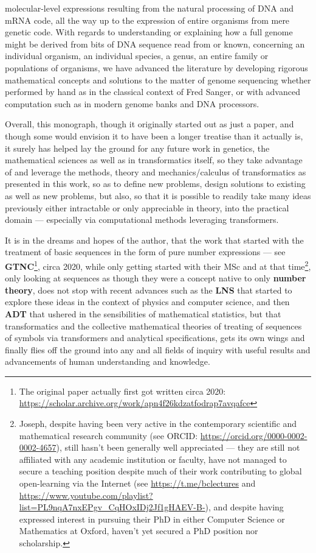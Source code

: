 \documentclass[a4paper, 18pt]{book} %
\begin{document}
molecular-level expressions resulting from the natural processing of DNA and mRNA code, all the way up to the expression of entire organisms from mere genetic code. With regards to understanding or explaining how a full genome might be derived from bits of DNA sequence read from or known, concerning an individual organism, an individual species, a genus, an entire family or populations of organisms, we have advanced the literature by developing rigorous mathematical concepts and solutions to the matter of genome sequencing whether performed by hand as in the classical context of Fred Sanger, or with advanced computation such as in modern genome banks and DNA processors. 

Overall, this monograph, though it originally started out as just a paper, and though some would envision it to have been a longer treatise than it actually is, it surely has helped lay the ground for any future work in genetics, the mathematical sciences as well as in transformatics itself, so they take advantage of and leverage the methods, theory and mechanics/calculus of transformatics as presented in this work, so as to define new problems, design solutions to existing as well as new problems, but also, so that it is possible to readily take many ideas previously either intractable or only appreciable in theory, into the practical domain --- especially via computational methods leveraging transformers.

It is in the dreams and hopes of the author, that the work that started with the treatment of basic sequences in the form of pure number expressions --- see \textbf{GTNC}\footnote{The original paper actually first got written circa 2020: \url{https://scholar.archive.org/work/apn4f26kdzatfodrap7avqafce}}\cite{Lutalo2024gtnc}, circa 2020, while only getting started with their MSc and at that time\footnote{Joseph, despite having been very active in the contemporary scientific and mathematical research community (see ORCID: \url{https://orcid.org/0000-0002-0002-4657}), still hasn't been generally well appreciated --- they are still not affiliated with any academic institution or faculty, have not managed to secure a teaching position despite much of their work contributing to global open-learning via the Internet (see \url{https://t.me/bclectures} and \url{https://www.youtube.com/playlist?list=PL9nqA7nxEPgv_CqHOxIDj2Jf1gHAEV-B-}), and despite having expressed interest in pursuing their PhD in either Computer Science or Mathematics at Oxford\cite{lutalo_2025_sop}, haven't yet secured a PhD position nor scholarship.}, only looking at sequences as though they were a concept native to only \textbf{number theory}, does not stop with recent advances such as the \textbf{LNS}\cite{lnspaper} that started to explore these ideas in the context of physics and computer science, and then \textbf{ADT} that ushered in the sensibilities of mathematical statistics, but that transformatics and the collective mathematical theories of treating of sequences of symbols via transformers and analytical specifications, gets its own wings and finally flies off the ground into any and all fields of inquiry with useful results and advancements of human understanding and knowledge. 
\end{document}
